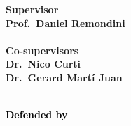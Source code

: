 \documentclass[12pt,a4paper]{report}
\begin{document}
\begin{titlepage}
    \begin{minipage}[t]{0.47\textwidth}
        \vspace*{-19pt}
        {\large{\bf Supervisor
        \vspace{2mm}\\
        Prof.\ Daniel Remondini\\\\
        Co-supervisors
        \vspace{2mm}\\
        Dr.\ Nico Curti\\
        Dr.\ Gerard Martí Juan\\\\}}
    \end{minipage}
    \hfill
    \begin{minipage}[L]{0.23\textwidth} \textcolor{black}{
        {\large{\bf  Defended by
        \vspace{2mm}\\
        }}
        }
    \end{minipage}

\end{titlepage}
\restoregeometry

\newpage\null\thispagestyle{empty}\newpage
\end{document}
